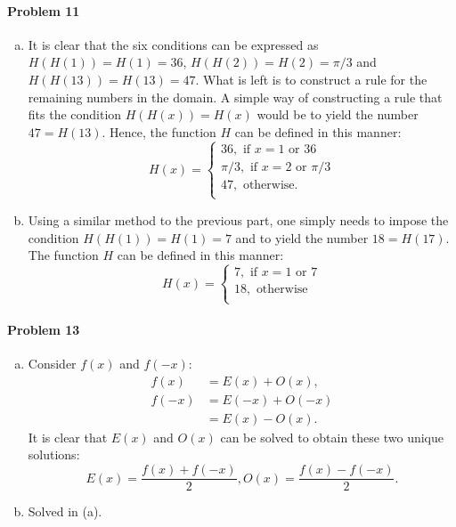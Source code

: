 \documentclass{article}
\begin{document}
\paragraph{Problem 11}
\begin{enumerate}[(d)]
  \item It is clear that the six conditions can be expressed as $H(H(1)) = H(1)
    = 36$, $H(H(2)) = H(2) = \pi/3$ and $H(H(13)) = H(13) = 47$. What is left
    is to construct a rule for the remaining numbers in the domain. A simple
    way of constructing a rule that fits the condition $H(H(x)) = H(x)$ would
    be to yield the number $47 = H(13)$. Hence, the function $H$ can be defined
    in this manner: \[
      H(x) =
      \begin{cases}
        36, \text{ if } x = 1 \text{ or } 36 \\
        \pi/3, \text{ if } x = 2 \text{ or } \pi/3 \\
        47, \text{ otherwise.} \\
      \end{cases}
    \]
  \item Using a similar method to the previous part, one simply needs to impose
    the condition $H(H(1)) = H(1) = 7$ and to yield the number $18 = H(17)$.
    The function $H$ can be defined in this manner: \[
      H(x) =
      \begin{cases}
        7, \text{ if } x = 1 \text{ or } 7 \\
        18, \text{ otherwise} \\
      \end{cases}
    \]
\end{enumerate}

\paragraph{Problem 13}
\begin{enumerate}[(a)]
  \item Consider $f(x)$ and $f(-x)$:
    \begin{align*}
      f(x)  &= E(x) + O(x), \\
      f(-x) &= E(-x) + O(-x) \\
            &= E(x) - O(x).
    \end{align*}
    It is clear that $E(x)$ and $O(x)$ can be solved to obtain these two unique
    solutions: \[
      E(x) = \frac{f(x) + f(-x)}{2}, O(x) = \frac{f(x) - f(-x)}{2}.
    \]
  \item Solved in (a).
\end{enumerate}
\end{document}
